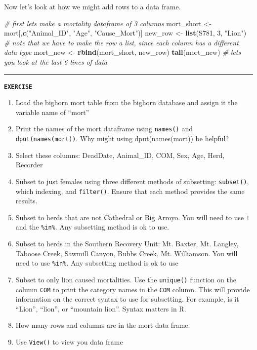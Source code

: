 \documentclass[
]{book}
\newenvironment{Shaded}{\begin{snugshade}}{\end{snugshade}}
\newcommand{\CommentTok}[1]{\textcolor[rgb]{0.56,0.35,0.01}{\textit{#1}}}
\newcommand{\DecValTok}[1]{\textcolor[rgb]{0.00,0.00,0.81}{#1}}
\newcommand{\FunctionTok}[1]{\textcolor[rgb]{0.13,0.29,0.53}{\textbf{#1}}}
\newcommand{\NormalTok}[1]{#1}
\newcommand{\OtherTok}[1]{\textcolor[rgb]{0.56,0.35,0.01}{#1}}
\newcommand{\StringTok}[1]{\textcolor[rgb]{0.31,0.60,0.02}{#1}}
\providecommand{\tightlist}{%
  \setlength{\itemsep}{0pt}\setlength{\parskip}{0pt}}
\begin{document}
Now let's look at how we might add rows to a data frame.

\begin{Shaded}
\begin{Highlighting}[]
\CommentTok{\# first let\textquotesingle{}s make a mortality dataframe of 3 columns}
\NormalTok{mort\_short }\OtherTok{\textless{}{-}}\NormalTok{ mort[,}\FunctionTok{c}\NormalTok{(}\StringTok{"Animal\_ID"}\NormalTok{, }\StringTok{"Age"}\NormalTok{, }\StringTok{"Cause\_Mort"}\NormalTok{)]}
\NormalTok{new\_row }\OtherTok{\textless{}{-}} \FunctionTok{list}\NormalTok{(}\StringTok{\textquotesingle{}S781\textquotesingle{}}\NormalTok{, }\DecValTok{3}\NormalTok{, }\StringTok{"Lion"}\NormalTok{) }
\CommentTok{\# note that we have to make the row a list, since each column has a different data type}
\NormalTok{mort\_new }\OtherTok{\textless{}{-}} \FunctionTok{rbind}\NormalTok{(mort\_short, new\_row)}
\FunctionTok{tail}\NormalTok{(mort\_new) }\CommentTok{\# lets you look at the last 6 lines of data}
\end{Highlighting}
\end{Shaded}

\begin{center}\rule{0.5\linewidth}{0.5pt}\end{center}

\textbf{\texttt{EXERCISE}}

\begin{enumerate}
\def\labelenumi{\arabic{enumi}.}
\tightlist
\item
  Load the bighorn mort table from the bighorn database and assign it the variable name of ``mort''
\item
  Print the names of the mort dataframe using \texttt{names()} and \texttt{dput(names(mort))}. Why might using dput(names(mort)) be helpful?
\item
  Select these columns: DeadDate, Animal\_ID, COM, Sex, Age, Herd, Recorder
\item
  Subset to just females using three different methods of subsetting: \texttt{subset()}, which indexing, and \texttt{filter()}. Ensure that each method provides the same results.
\item
  Subset to herds that are not Cathedral or Big Arroyo. You will need to use \texttt{!} and the \texttt{\%in\%}. Any subsetting method is ok to use.
\item
  Subset to herds in the Southern Recovery Unit: Mt. Baxter, Mt. Langley, Taboose Creek, Sawmill Canyon, Bubbs Creek, Mt. Williamson. You will need to use \texttt{\%in\%}. Any subsetting method is ok to use
\item
  Subset to only lion caused mortalities. Use the \texttt{unique()} function on the column \texttt{COM} to print the category names in the \texttt{COM} column. This will provide information on the correct syntax to use for subsetting. For example, is it ``Lion'', ``lion'', or ``mountain lion''. Syntax matters in R.
\item
  How many rows and columns are in the mort data frame.
\item
  Use \texttt{View()} to view you data frame
\end{enumerate}
\end{document}
